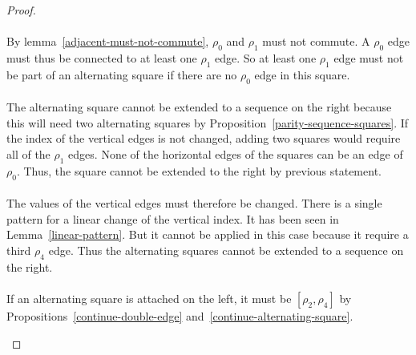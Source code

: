 \begin{proof}
\begin{figure}[H]
\begin{center}
\begin{tikzpicture}[scale=.8]
    \end{tikzpicture}
    \caption{}
  \end{center}
\end{figure}

\paragraph{}
By lemma~\ref{adjacent-must-not-commute}, $\rho_0$ and $\rho_1$ must not commute. A $\rho_0$ edge must thus be connected to at least one $\rho_1$ edge. So at least one $\rho_1$ edge must not be part of an alternating square if there are no $\rho_0$ edge in this square.

\paragraph{}
The alternating square cannot be extended to a sequence on the right because this will need two alternating squares by Proposition~\ref{parity-sequence-squares}.  If the index of the vertical edges is not changed, adding two squares would require all of the $\rho_1$ edges. None of the horizontal edges of the squares can be an edge of $\rho_0$. Thus, the square cannot be extended to the right by previous statement.

\paragraph{}
The values of the vertical edges must therefore be changed. There is a single pattern for a linear change of the vertical index. It has been seen in Lemma~\ref{linear-pattern}. But it cannot be applied in this case because it require a third $\rho_4$ edge. Thus the alternating squares cannot be extended to a sequence on the right.

\paragraph{}
If an alternating square is attached on the left, it must be $[\rho_2, \rho_4]$ by Propositions~\ref{continue-double-edge} and~\ref{continue-alternating-square}.

\begin{figure}[H]
  \begin{center}
\end{center}
\end{figure}
\end{proof}
